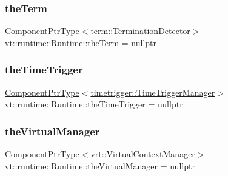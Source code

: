 \mbox{\label{structvt_1_1runtime_1_1_runtime_a365e1addbed82440bb014f97b1c839f6}} 
\subsubsection{\texorpdfstring{the\+Term}{theTerm}}
{\footnotesize\ttfamily \hyperlink{structvt_1_1runtime_1_1_runtime_a0893bf0a8c03b898e8ab66b52cec80ad}{Component\+Ptr\+Type}$<$\hyperlink{structvt_1_1term_1_1_termination_detector}{term\+::\+Termination\+Detector}$>$ vt\+::runtime\+::\+Runtime\+::the\+Term = nullptr}

\mbox{\label{structvt_1_1runtime_1_1_runtime_a3d72d73ecd4ba3f0104dca596eae3862}} 
\subsubsection{\texorpdfstring{the\+Time\+Trigger}{theTimeTrigger}}
{\footnotesize\ttfamily \hyperlink{structvt_1_1runtime_1_1_runtime_a0893bf0a8c03b898e8ab66b52cec80ad}{Component\+Ptr\+Type}$<$\hyperlink{structvt_1_1timetrigger_1_1_time_trigger_manager}{timetrigger\+::\+Time\+Trigger\+Manager}$>$ vt\+::runtime\+::\+Runtime\+::the\+Time\+Trigger = nullptr}

\mbox{\label{structvt_1_1runtime_1_1_runtime_a85a0606ac06cd173561952676f09c077}} 
\subsubsection{\texorpdfstring{the\+Virtual\+Manager}{theVirtualManager}}
{\footnotesize\ttfamily \hyperlink{structvt_1_1runtime_1_1_runtime_a0893bf0a8c03b898e8ab66b52cec80ad}{Component\+Ptr\+Type}$<$\hyperlink{structvt_1_1vrt_1_1_virtual_context_manager}{vrt\+::\+Virtual\+Context\+Manager}$>$ vt\+::runtime\+::\+Runtime\+::the\+Virtual\+Manager = nullptr}

